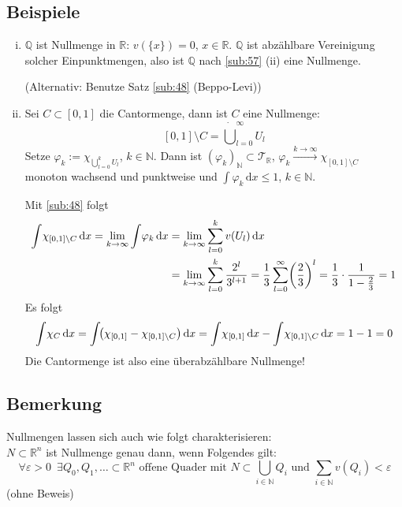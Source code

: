 \subsection[Beispiele für Nullmengen]{Beispiele} %
\label{sub:510}
\begin{enumerate}[(i)]
	\item $\mathds{Q}$ ist Nullmenge in $\mathds{R}$: $v(\{x\}) =0$, $x \in \mathds{R}$. $\mathds{Q}$ ist abzählbare Vereinigung solcher Einpunktmengen, also ist 
	$\mathds{Q}$ nach \ref{sub:57} (ii) eine Nullmenge.
	
	(Alternativ: Benutze Satz \ref{sub:48} (Beppo-Levi))
	\item Sei $C \subset [0,1]$ die Cantormenge, dann ist $C$ eine Nullmenge: 
	\[
		[0,1] \setminus C =  \dot \bigcup_{l=0}^\infty U_l
	\]
	Setze $\varphi_k := \chi_{\bigcup_{l=0}^k U_l}$, $k \in \mathds{N}$. Dann ist $(\varphi_k)_\mathds{N} \subset \mathcal{T}_{\mathds{R}}$, $\varphi_k \xrightarrow{k \to \infty} \chi_{[0,1] \setminus C}$ monoton wachsend und punktweise und $\int\! \varphi_k  \, \mathrm{d}x  \le 1$, $k \in \mathds{N}$.
	
	Mit \ref{sub:48} folgt 
	\begin{align*}
		\int\! \chi_{[0,1] \setminus C}  \, \mathrm{d}x = \lim_{ k \to \infty} \int\! \varphi_k  \, \mathrm{d}x  &= \lim_{ k \to \infty} \sum_{l=0}^{k} v(U_l)  \, \mathrm{d}x \\
		&= \lim_{ k \to \infty} \sum_{l=0}^{k} \frac{2^l}{3^{l+1}} = \frac{1}{3} \sum_{l=0}^{\infty} \enbrace*{\frac{2}{3} }^l = \frac{1}{3} \cdot \frac{1}{1-\frac{2}{3} }
		= 1       
	\end{align*}
	Es folgt 
	\begin{align*}
		\int\! \chi_C  \, \mathrm{d}x = \int\! \enbrace*{\chi_{[0,1]} - \chi_{[0,1] \setminus C}}  \, \mathrm{d}x = \int\! \chi_{[0,1]}  \, \mathrm{d}x  - \int\!
		\chi_{[0,1] \setminus C}  \, \mathrm{d}x  = 1-1 = 0 
	\end{align*}
	Die Cantormenge ist also eine überabzählbare Nullmenge! \bewende
\end{enumerate}

\subsection[Bemerkung: Alternative Charakterisierung von Nullmengen]{Bemerkung} %
\label{sub:511}
Nullmengen lassen sich auch wie folgt charakterisieren: \\
$N \subset \mathds{R}^n$ ist Nullmenge genau dann, wenn Folgendes gilt:
\[
	\forall \varepsilon > 0 \enspace \exists Q_0, Q_1, \ldots  \subset \mathds{R}^n  \text{ offene Quader mit } N \subset \bigcup_{i \in \mathds{N}}Q_i \text{ und }
	\sum_{i \in \mathds{N}} v(Q_i) < \varepsilon
\]
(ohne Beweis)

